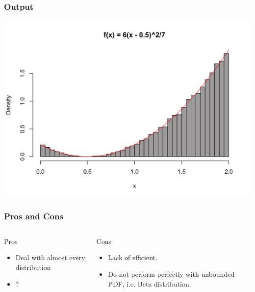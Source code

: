 \begin{frame}
    \frametitle{Output}

    \begin{center}
        \includegraphics[width = .9\linewidth]{image2.png}
    \end{center}

\end{frame}

\begin{frame}
    \frametitle{Pros and Cons}
    \begin{columns}
        \begin{block}{Pros}
            \begin{itemize}
                \item Deal with almost every distribution
                \item ?
            \end{itemize}
        \end{block}
        
        \begin{block}{Cons}
            \begin{itemize}
                \item Lack of efficient.
                \item Do not perform perfectly with unbounded PDF, i.e. Beta distribution.
            \end{itemize}
        \end{block}

        
    \end{columns}

    

\end{frame}

